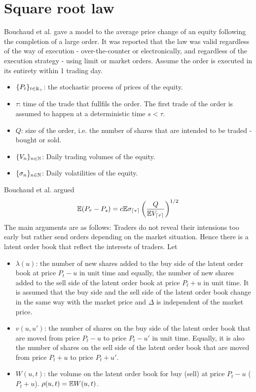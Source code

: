 \section{Square root law}
Bouchaud et al. \cite{Bouchaud2011} gave a model to the average price
change of an equity following the completion of a large order. It was
reported that the law was valid regardless of the way of execution -
over-the-counter or electronically, and regardless of the execution
strategy - using limit or market orders. Assume the order is executed
in its entirety within 1 trading day.
\begin{itemize}
\item $\{P_t\}_{t \in \mathbb R_+}$: the stochastic process of prices of
  the equity.
\item $\tau$: time of the trade that fullfils the order. The first
  trade of the order is assumed to happen at a deterministic time
  $s < \tau$.
\item $Q$: size of the order, i.e. the number of shares that are
  intended to be traded - bought or sold.
\item $\{V_n\}_{n \in \mathbb N}$: Daily trading volumes of the
  equity.
\item $\{\sigma_n\}_{n \in \mathbb N}$: Daily volatilities of the
  equity.
\end{itemize}
Bouchaud et al. \cite{Bouchaud2011} argued
\[
  \mathbb{E} (P_\tau - P_s) = c \mathbb{E} \sigma_{\lceil \tau\rceil} \left(
    {Q \over \mathbb{E} V_{\lceil \tau\rceil}}
  \right)^{1/2}
\]
The main arguments are as follows: Traders do not reveal their
intensions too early but rather send orders depending on the market
situation. Hence there is a latent order book that reflect the
interests of traders. Let
\begin{itemize}
\item $\lambda(u)$: the number of new shares added to the buy side of
  the latent order book at price $P_t - u$ in unit time and equally,
  the number of new shares added to the sell side of the latent order
  book at price $P_t + u$ in unit time. It is assumed that the buy
  side and the sell side of the latent order book change in the same
  way with the market price and $\Delta$ is independent of the market
  price.

\item $v(u, u')$: the number of shares on the buy side of the latent
  order book that are moved from price $P_t - u$ to price $P_t - u'$
  in unit time. Equally, it is also the number of shares on the sell
  side of the latent order book that are moved from price $P_t + u$
  to price $P_t + u'$.

\item $W (u, t)$: the volume on the latent order book for buy (sell)
  at price $P_t - u$ ($P_t + u$). $\rho(u, t) = \mathbb{E} W(u, t)$.
\end{itemize}

